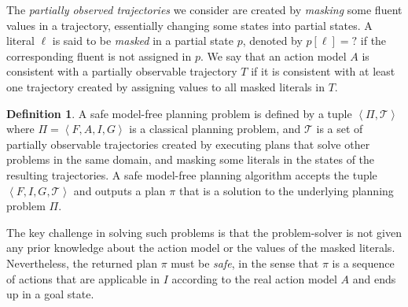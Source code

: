 \documentclass{article}
\theoremstyle{plain}
\theoremstyle{definition}
\newtheorem{definition}[theorem]{Definition}
\theoremstyle{remark}
\theoremstyle{observation}
\newcommand{\tuple}[1]{\ensuremath{\left \langle #1 \right \rangle }}
\newcommand{\unobserved}{\textit{?}}
\begin{document}

The \emph{partially observed trajectories} we consider are created by \emph{masking} some fluent values in a trajectory, essentially changing some states into partial states. 
A literal $\ell$ is said to be \emph{masked} in a partial state $p$, denoted by $p[\ell]=\unobserved$ if the corresponding fluent is not assigned in $p$. 
We say that an action model $A$ is consistent with a partially observable trajectory $T$ if 
it is consistent with at least one trajectory created by assigning values to all masked literals in $T$.  
\begin{definition}
A safe model-free planning problem is defined by a tuple $\tuple{\Pi, \mathcal{T}}$ 
where $\Pi=\tuple{F,A,I,G}$ is a classical planning problem, 
and $\mathcal{T}$ is a set of partially observable trajectories created by 
executing plans that solve other problems in the same domain, %
and masking some literals in the states of the resulting trajectories.  
A safe model-free planning algorithm accepts the tuple $\tuple{F,I,G,\mathcal{T}}$ and outputs a plan $\pi$ that is a solution to the underlying planning problem $\Pi$. 
\label{def:theProblem}
\end{definition}
The key challenge in solving such problems is that the problem-solver is not given any prior knowledge about the action model or the values of the masked literals. 
Nevertheless, the returned plan $\pi$ must be \emph{safe}, in the sense that $\pi$ is a sequence of actions that are applicable in $I$ according to the real action model $A$ and ends up in a goal state. 
\end{document}
